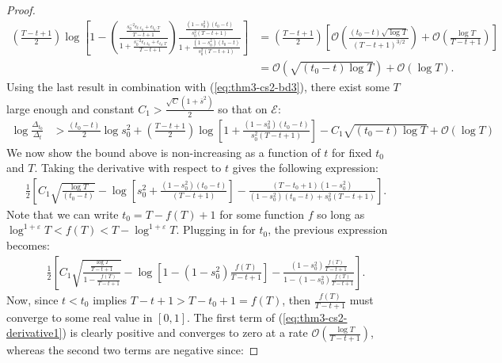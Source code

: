 \begin{proof}
\small
\begin{align*}
    \left(\frac{T - t +1}{2}\right)\log\left[1 - \left(\frac{\frac{s_0^{-2}\epsilon_{t:t_0} + \epsilon_{t_0:T}}{T-t+1}}{1 + \frac{s_0^{-2}\epsilon_{t:t_0} + \epsilon_{t_0:T}}{T-t+1}}\right)\frac{\frac{(1 - s_0^2)(t_0 - t)}{s_0^{2}(T-t+1)}}{1 + \frac{(1 - s_0^2)(t_0 - t)}{s_0^{2}(T-t+1)}}\right] &= \left(\frac{T - t +1}{2}\right)\left[\mathcal{O}\left(\frac{(t_0-t)\sqrt{\log T}}{(T-t+1)^{3/2}}\right)  + \mathcal{O}\left(\frac{\log T}{T-t+1}\right) \right] \\
    &= \mathcal{O}\left(\sqrt{(t_0-t)\log T}\right) + \mathcal{O}(\log T). \tag{$T-t+1 > t_0-t$}
\end{align*}
\normalsize
Using the last result in combination with (\ref{eq:thm3-cs2-bd3}), there exist some $T$ large enough and constant $C_1 > \frac{\sqrt{C}(1+\overline{s}^2)}{2}$ so that on $\mathcal{E}$: 
\begin{align}
    \log \frac{\Delta_{t_0}}{\Delta_t} &> \frac{(t_0-t)}{2}\log s_0^2 + \left(\frac{T - t +1}{2}\right)\log\left[1 + \frac{(1 - s_0^2)(t_0 - t)}{s_0^{2}(T-t+1)}\right] - C_1\sqrt{(t_0 -t)\log T} + \mathcal{O}(\log T) \label{eq:thm3-cs2-bd4}
\end{align}
We now show the bound above is non-increasing as a function of $t$ for fixed $t_0$ and $T$. Taking the derivative with respect to $t$ gives the following expression: 
\small
\begin{align*}
    \frac{1}{2}\left[C_1\sqrt{\frac{\log T}{(t_0 - t)}} - \log\left[s_0^2 + \frac{(1 - s_0^2)(t_0 - t)}{(T-t+1)}\right] - \frac{(T-t_0+1)(1-s_0^2)}{(1-s_0^2)(t_0-t) + s_0^2(T-t+1)}\right]. 
\end{align*}
\normalsize
Note that we can write $t_0 = T - f(T) + 1$ for some function $f$ so long as $\log^{1+\varepsilon} T < f(T) <T - \log^{1+\varepsilon} T$. Plugging in for $t_0$, the previous expression becomes:
\small
\begin{align}\label{eq:thm3-cs2-derivative1}
    \frac{1}{2}\left[C_1\sqrt{\frac{\frac{\log T}{T - t + 1}}{1 - \frac{f(T)}{T - t + 1}}} - \log\left[1 - (1 - s_0^2)\frac{f(T)}{T-t+1}\right] - \frac{(1 - s_0^2)\frac{f(T)}{T-t+1}}{1 - (1-s_0^2)\frac{f(T)}{T - t + 1}}\right]. 
\end{align}
\normalsize
Now, since $t < t_0$ implies $T-t+1 > T- t_0+1 = f(T)$, then $\frac{f(T)}{T-t+1}$ must converge to some real value in $[0,1]$. The first term of (\ref{eq:thm3-cs2-derivative1}) is clearly positive and converges to zero at a rate $\mathcal{O}\left(\frac{\log T}{T-t+1}\right)$, whereas the second two terms are negative since:

\end{proof}
